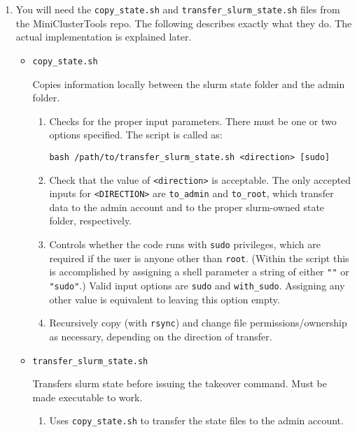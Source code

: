 \begin{enumerate}
\item You will need the \texttt{copy\_state.sh} and \texttt{transfer\_slurm\_state.sh} files from the MiniClusterTools repo. The following describes exactly what they do. The actual implementation is explained later.

	\begin{itemize}
	\item \texttt{copy\_state.sh}

		Copies information locally between the slurm state folder and the admin folder.

		\begin{enumerate}
		\item Checks for the proper input parameters. There must be one or two options specified. The script is called as:

			\texttt{bash /path/to/transfer\_slurm\_state.sh <direction> [sudo]}

		\item Check that the value of \texttt{<direction>} is acceptable. The only accepted inputs for \texttt{<DIRECTION>} are \texttt{to\_admin} and \texttt{to\_root}, which transfer data to the admin account and to the proper slurm-owned state folder, respectively. 

		\item Controls whether the code runs with \texttt{sudo} privileges, which are required if the user is anyone other than \texttt{root}. (Within the script this is accomplished by assigning a shell parameter a string of either \texttt{""} or \texttt{"sudo"}.) Valid input options are \texttt{sudo} and \texttt{with\_sudo}. Assigning any other value is equivalent to leaving this option empty.

		\item Recursively copy (with \texttt{rsync}) and change file permissions/ownership as necessary, depending on the direction of transfer.
		\end{enumerate}

	\item \texttt{transfer\_slurm\_state.sh}

		Transfers slurm state before issuing the takeover command. Must be made executable to work.

		\begin{enumerate}
		\item Uses \texttt{copy\_state.sh} to transfer the state files to the admin account.


\end{enumerate}
\end{itemize}
\end{enumerate}
